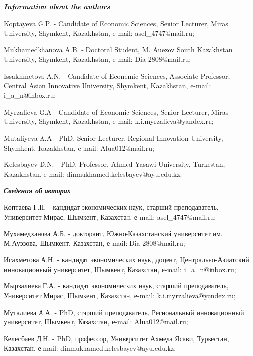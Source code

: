 \begin{info}
\hspace{1em}\emph{{\bfseries Information about the authors}}

Koptayeva G.P. - Candidate of Economic Sciences, Senior Lecturer,
Miras University, Shymkent, Kazakhstan, e-mail: asel\_4747@mail.ru;

Mukhamedkhanova A.B. - Doctoral Student, M. Auezov South Kazakhstan
University, Shymkent, Kazakhstan, e-mail: Dia-2808@mail.ru;

Issakhmetova A.N. - Candidate of Economic Sciences, Associate
Professor, Central Asian Innovative University, Shymkent, Kazakhstan,
e-mail: i\_a\_n@inbox.ru;

Myrzalieva G.A - Candidate of Economic Sciences, Senior Lecturer,
Miras University, Shymkent, Kazakhstan, e-mail:
k.i.myrzalieva@yandex.ru;

Mutaliyeva A.A - PhD, Senior Lecturer, Regional Innovation University,
Shymkent, Kazakhstan, e-mail: Alua012@mail.ru;

Kelesbayev D.N. - PhD, Professor, Ahmed Yasawi University, Turkestan,
Kazakhstan, e-mail: dinmukhamed.kelesbayev@ayu.edu.kz.

\hspace{1em}\emph{{\bfseries Сведения об авторах}}

Коптаева Г.П. - кандидат экономических наук, старший преподаватель,
Университет Мирас, Шымкент, Казахстан, е-mail: asel\_4747@mail.ru;

Мухамедханова А.Б. - докторант, Южно-Казахстанский университет им.
М.Ауэзова, Шымкент, Казахстан, е-mail: Dia-2808@mail.ru;

Исахметова А.Н. - кандидат экономических наук, доцент,
Центрально-Азиатский инновационный университет, Шымкент, Казахстан,
е-mail: i\_a\_n@inbox.ru;

Мырзалиева Г.А. - кандидат экономических наук, старший преподаватель,
Университет Мирас, Шымкент, Казахстан, е-mail:
k.i.myrzalieva@yandex.ru;

Муталиева А.А. - PhD, старший преподаватель, Региональный
инновационный университет, Шымкент, Казахстан, е-mail:
Alua012@mail.ru;

Келесбаев Д.Н. - PhD, профессор, Университет Ахмеда Ясави, Туркестан,
Казахстан, е-mail: dinmukhamed.kelesbayev@ayu.edu.kz.
\end{info}
